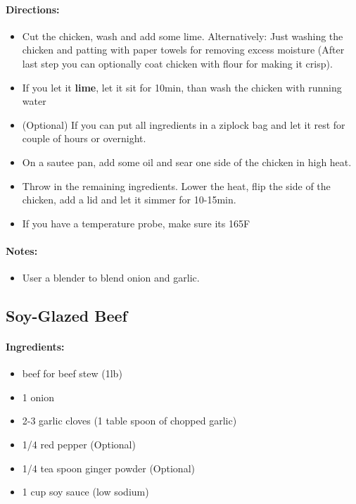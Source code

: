 \documentclass{article}
\begin{document}
\paragraph{Directions:}
\begin{itemize}
    \item Cut the chicken, wash and add some lime. Alternatively: Just washing the chicken and patting with paper towels for removing excess moisture (After last step you can optionally coat chicken with flour for making it crisp).
    \item If you let it \textbf{lime}, let it sit for 10min, than wash the chicken with running water
    \item (Optional) If you can put all ingredients in a ziplock bag and let it rest for couple of hours or overnight.
    \item On a sautee pan, add some oil and sear one side of the chicken in high heat.
    \item Throw in the remaining ingredients. Lower the heat, flip the side of the chicken, add a lid and let it simmer for 10-15min.
    \item If you have a temperature probe, make sure its 165F
\end{itemize}

\paragraph{Notes:}
\begin{itemize}
    \item User a blender to blend onion and garlic.
\end{itemize}

\subsection{Soy-Glazed Beef}

\paragraph{Ingredients:}
\begin{itemize}
    \item beef for beef stew (1lb)
    \item 1 onion
    \item 2-3 garlic cloves (1 table spoon of chopped garlic)
    \item 1/4 red pepper (Optional)
    \item 1/4 tea spoon ginger powder (Optional)
    \item 1 cup soy sauce (low sodium)
\end{itemize}
\end{document}
